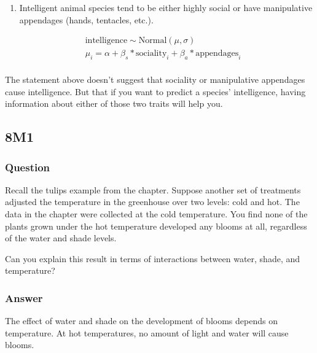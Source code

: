\documentclass[
]{book}
\providecommand{\tightlist}{%
  \setlength{\itemsep}{0pt}\setlength{\parskip}{0pt}}
\begin{document}
\begin{enumerate}
\def\labelenumi{\arabic{enumi}.}
\setcounter{enumi}{3}
\tightlist
\item
  Intelligent animal species tend to be either highly social or have manipulative appendages (hands, tentacles, etc.).
\end{enumerate}

\[
\begin{aligned}
&\text{intelligence} \sim \text{Normal}(\mu,\sigma) \\
&\mu_i = \alpha + \beta_{s} * \text{sociality}_i + \beta_a * \text{appendages}_i  \\
\end{aligned}
\]

The statement above doesn't suggest that sociality or manipulative appendages cause intelligence. But that if you want to predict a species' intelligence, having information about either of those two traits will help you.

\hypertarget{m1-5}{%
\subsection*{8M1}\label{m1-5}}

\hypertarget{question-78}{%
\subsubsection*{Question}\label{question-78}}

Recall the tulips example from the chapter. Suppose another set of treatments adjusted the temperature in the greenhouse over two levels: cold and hot.
The data in the chapter were collected at the cold temperature. You find none of the plants grown under the hot temperature developed any blooms at all, regardless of the water and shade levels.

Can you explain this result in terms of interactions between water, shade, and temperature?

\hypertarget{answer-78}{%
\subsubsection*{Answer}\label{answer-78}}

The effect of water and shade on the development of blooms depends on temperature. At hot temperatures, no amount of light and water will cause blooms.
\end{document}
